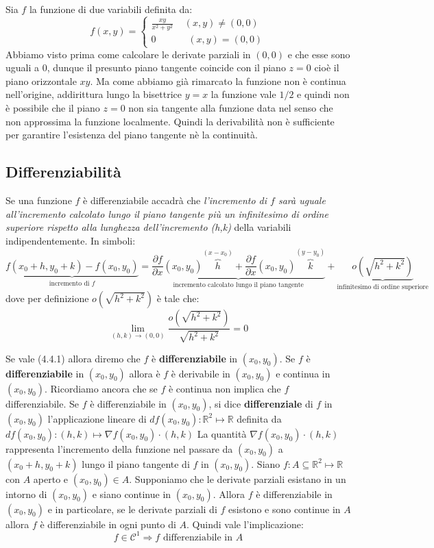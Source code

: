 \documentclass[a4paper]{article}
\numberwithin{equation}{subsection}
\begin{document}
\ex{}
{
    Sia $f$ la funzione di due variabili definita da: 
    \[f(x,y) = \begin{cases}
        \frac{xy}{x^2 + y^2} \; \; \; \; (x,y) \neq (0,0)\\
        0 \; \; \; \; \; \; \;  \; \; \; \; \; (x,y) = (0,0)
    \end{cases}\]
    Abbiamo visto prima come calcolare le derivate parziali in $(0,0)$ e che esse sono uguali a $0$, dunque il presunto 
    piano tangente coincide con il piano $z = 0$ cioè il piano orizzontale $xy$. Ma come abbiamo già rimarcato la funzione
    non è continua nell'origine, addirittura lungo la bisettrice $y = x$ la funzione vale $1/2$ e quindi non è possibile
    che il piano $z = 0$ non sia tangente alla funzione data nel senso che non approssima la funzione localmente. 
    Quindi la derivabilità non è sufficiente per garantire l'esistenza del piano tangente nè la continuità.
}

\subsection{Differenziabilità}

Se una funzione $f$ è differenziabile accadrà che \textit{l'incremento di $f$ sarà uguale all'incremento calcolato 
lungo il piano tangente più un infinitesimo di ordine superiore rispetto alla lunghezza dell'incremento (h,k)} della variabili indipendentemente.
In simboli:
\begin{equation}
    \underbrace{f(x_0 + h, y_0 + k) - f(x_0,y_0)}_{\text{incremento di $f$}} = \underbrace{\frac{\partial f}{\partial x} (x_0,y_0) \overbrace{h}^{(x-x_0)} + \frac{\partial f}{\partial x}(x_0, y_0) \overbrace{k}^{(y-y_0)}}_{\text{incremento calcolato lungo il piano tangente}} + \underbrace{o(\sqrt{h^2 + k^2})}_{\text{infinitesimo di ordine superiore}}
\end{equation}
\noindent
dove per definizione $o(\sqrt{h^2 + k^2})$ è tale che:
\[\lim_{(h,k) \rightarrow (0,0)} \frac{o(\sqrt{h^2 + k^2})}{\sqrt{h^2 + k^2}} = 0\]

\dfn{}
{
    Se vale (4.4.1) allora diremo che $f$ è \textbf{differenziabile} in $(x_0,y_0)$.
}
\noindent
Se $f$ è \textbf{differenziabile} in $(x_0,y_0)$ allora è $f$ è derivabile in $(x_0,y_0)$ e continua in $(x_0,y_0)$.
Ricordiamo ancora che se $f$ è continua non implica che $f$ differenziabile. 
\dfn{}
{
    Se $f$ è differenziabile in $(x_0,y_0)$, si dice \textbf{differenziale} di $f$ in $(x_0,y_0)$ l'applicazione lineare di $df(x_0,y_0) : \mathbb{R}^2 \mapsto \mathbb{R}$ definita da $df(x_0,y_0) : (h,k) \mapsto \nabla f(x_0,y_0) \cdot (h,k)$
}
La quantità $\nabla f(x_0,y_0) \cdot (h,k)$ rappresenta l'incremento della funzione nel passare da $(x_0,y_0)$ a $(x_0 + h, y_0 + k)$ lungo il piano tangente di $f$ in $(x_0,y_0)$.
\thm{}
{
    Siano $f : A \subseteq \mathbb{R}^2 \mapsto \mathbb{R}$ con $A$ aperto e $(x_0,y_0) \in A$. Supponiamo che le derivate parziali esistano in un intorno di $(x_0,y_0)$ e siano continue in $(x_0,y_0)$. Allora $f$ è differenziabile in $(x_0,y_0)$ e in particolare,
    se le derivate parziali di $f$ esistono e sono continue in $A$ allora $f$ è differenziabile in ogni punto di $A$. Quindi vale l'implicazione:
    \[f \in \mathcal{C}^1 \Longrightarrow f \text{ differenziabile in } A\]
}
\end{document}
